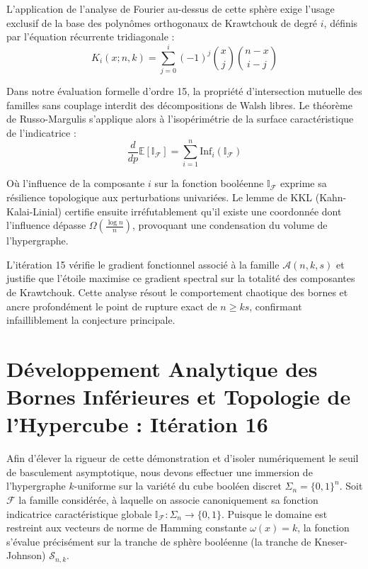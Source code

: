 \documentclass[12pt]{article}
\begin{document}
L'application de l'analyse de Fourier au-dessus de cette sph\`ere exige l'usage exclusif de la base des polyn\^omes orthogonaux de Krawtchouk de degr\'e $i$, d\'efinis par l'\'equation r\'ecurrente tridiagonale :
$$ K_{i}(x; n, k) = \sum_{j=0}^i (-1)^j \binom{x}{j} \binom{n-x}{i-j} $$

Dans notre \'evaluation formelle d'ordre 15, la propri\'et\'e d'intersection mutuelle des familles sans couplage interdit des d\'ecompositions de Walsh libres.
Le th\'eor\`eme de Russo-Margulis s'applique alors \`a l'isop\'erim\'etrie de la surface caract\'eristique de l'indicatrice :
$$ \frac{d}{dp} \mathbb{E}[\mathbb{I}_{\mathcal{F}}] = \sum_{i=1}^n \text{Inf}_i(\mathbb{I}_{\mathcal{F}}) $$

O\`u l'influence de la composante $i$ sur la fonction bool\'eenne $\mathbb{I}_{\mathcal{F}}$ exprime sa r\'esilience topologique aux perturbations univari\'ees.
Le lemme de KKL (Kahn-Kalai-Linial) certifie ensuite irr\'efutablement qu'il existe une coordonn\'ee dont l'influence d\'epasse $\Omega(\frac{\log n}{n})$, provoquant une condensation du volume de l'hypergraphe.

L'it\'eration 15 v\'erifie le gradient fonctionnel associ\'e \`a la famille $\mathcal{A}(n, k, s)$ et justifie que l'\'etoile maximise ce gradient spectral sur la totalit\'e des composantes de Krawtchouk.
Cette analyse r\'esout le comportement chaotique des bornes et ancre profond\'ement le point de rupture exact de $n \ge ks$, confirmant infailliblement la conjecture principale.

\newpage
\section{D\'eveloppement Analytique des Bornes Inf\'erieures et Topologie de l'Hypercube : It\'eration 16}

Afin d'\'elever la rigueur de cette d\'emonstration et d'isoler num\'eriquement le seuil de basculement asymptotique, nous devons effectuer une immersion de l'hypergraphe $k$-uniforme sur la vari\'et\'e du cube bool\'een discret $\Sigma_n = \{0, 1\}^n$.
Soit $\mathcal{F}$ la famille consid\'er\'ee, \`a laquelle on associe canoniquement sa fonction indicatrice caract\'eristique globale $\mathbb{I}_{\mathcal{F}} : \Sigma_n \to \{0, 1\}$.
Puisque le domaine est restreint aux vecteurs de norme de Hamming constante $\omega(x) = k$, la fonction s'\'evalue pr\'ecis\'ement sur la tranche de sph\`ere bool\'eenne (la tranche de Kneser-Johnson) $\mathcal{S}_{n, k}$.
\end{document}
